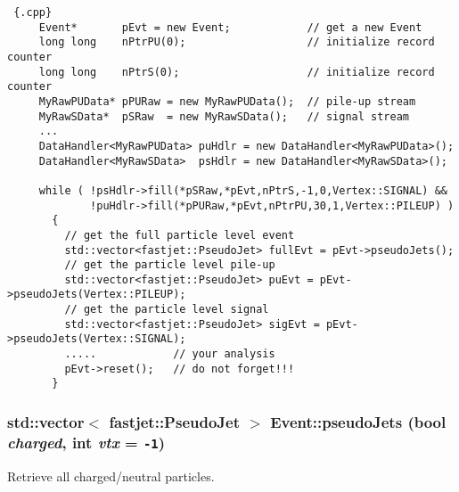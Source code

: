\begin{Code}\begin{verbatim} {.cpp}
     Event*       pEvt = new Event;            // get a new Event
     long long    nPtrPU(0);                   // initialize record counter
     long long    nPtrS(0);                    // initialize record counter
     MyRawPUData* pPURaw = new MyRawPUData();  // pile-up stream
     MyRawSData*  pSRaw  = new MyRawSData();   // signal stream
     ...
     DataHandler<MyRawPUData> puHdlr = new DataHandler<MyRawPUData>();
     DataHandler<MyRawSData>  psHdlr = new DataHandler<MyRawSData>();
     
     while ( !psHdlr->fill(*pSRaw,*pEvt,nPtrS,-1,0,Vertex::SIGNAL) &&
             !puHdlr->fill(*pPURaw,*pEvt,nPtrPU,30,1,Vertex::PILEUP) )
       {
         // get the full particle level event
         std::vector<fastjet::PseudoJet> fullEvt = pEvt->pseudoJets();
         // get the particle level pile-up
         std::vector<fastjet::PseudoJet> puEvt = pEvt->pseudoJets(Vertex::PILEUP);
         // get the particle level signal 
         std::vector<fastjet::PseudoJet> sigEvt = pEvt->pseudoJets(Vertex::SIGNAL);
         .....            // your analysis
         pEvt->reset();   // do not forget!!!  
       }
\end{verbatim}\end{Code}

 \hypertarget{classEvent_dc48cfe91cb7b2a10b83ba65584dbd41}{
\subsubsection[pseudoJets]{\setlength{\rightskip}{0pt plus 5cm}std::vector$<$ fastjet::Pseudo\-Jet $>$ Event::pseudo\-Jets (bool {\em charged}, int {\em vtx} = {\tt -1})}}
\label{classEvent_dc48cfe91cb7b2a10b83ba65584dbd41}


Retrieve all charged/neutral particles. 

